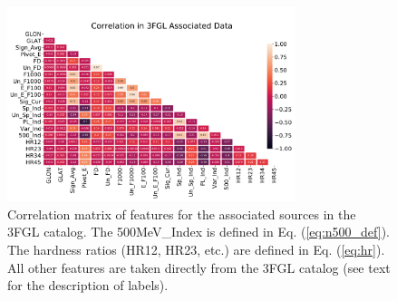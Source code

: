 \documentclass[referee]{aa} %
\begin{document}
\begin{figure}[h]
\centering
\includegraphics[width=0.75\textwidth]{plots/3fgl_assoc_cor.pdf}
\caption{Correlation matrix of features for the associated sources in the 3FGL catalog.
The 500MeV\_Index is defined in Eq. (\ref{eq:n500_def}).
The hardness ratios (HR12, HR23, etc.) are defined in Eq. (\ref{eq:hr}).
All other features are taken directly from the 3FGL catalog (see text for the description of labels).
}
\label{fig:assoc_corr_3fgli}
\end{figure}
\end{document}
